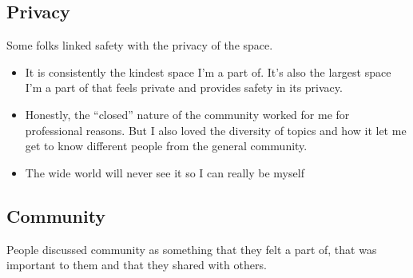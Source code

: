 \documentclass[
]{book}
\providecommand{\tightlist}{%
  \setlength{\itemsep}{0pt}\setlength{\parskip}{0pt}}
\begin{document}
\subsection{Privacy}\label{privacy}

Some folks linked safety with the privacy of the space.

\begin{itemize}
\tightlist
\item
  It is consistently the kindest space I'm a part of. It's also the largest space I'm a part of that feels private and provides safety in its privacy.
\item
  Honestly, the ``closed'' nature of the community worked for me for professional reasons. But I also loved the diversity of topics and how it let me get to know different people from the general community.
\item
  The wide world will never see it so I can really be myself
\end{itemize}

\subsection{Community}\label{community-1}

People discussed community as something that they felt a part of, that was important to them and that they shared with others.
\end{document}
